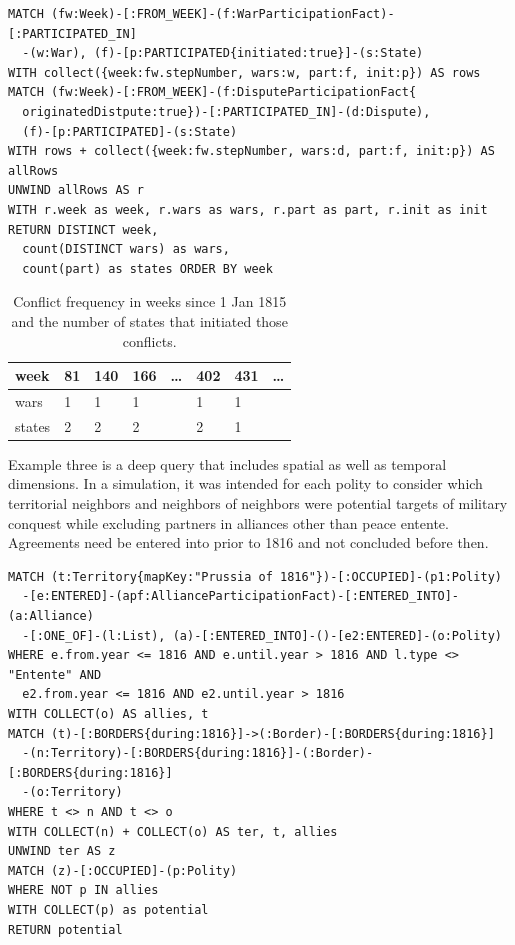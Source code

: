 \documentclass[runningheads]{llncs}
\begin{document}
\begin{lstlisting}[caption={Deep query example}, label={lst:deep}]
MATCH (fw:Week)-[:FROM_WEEK]-(f:WarParticipationFact)-[:PARTICIPATED_IN]
  -(w:War), (f)-[p:PARTICIPATED{initiated:true}]-(s:State)
WITH collect({week:fw.stepNumber, wars:w, part:f, init:p}) AS rows
MATCH (fw:Week)-[:FROM_WEEK]-(f:DisputeParticipationFact{
  originatedDistpute:true})-[:PARTICIPATED_IN]-(d:Dispute), 
  (f)-[p:PARTICIPATED]-(s:State)
WITH rows + collect({week:fw.stepNumber, wars:d, part:f, init:p}) AS allRows
UNWIND allRows AS r
WITH r.week as week, r.wars as wars, r.part as part, r.init as init
RETURN DISTINCT week, 
  count(DISTINCT wars) as wars, 
  count(part) as states ORDER BY week
\end{lstlisting}

\begin{table}[]
\begin{center}
\caption{Conflict frequency in weeks since 1 Jan 1815 and the number of states that initiated those conflicts.}\label{tab1}
\begin{tabular}{l|l|l|l|l|l|l|l}
week    & 81    & 140   & 166   & \dots & 402   & 431   & \dots \\
\hline
wars    & 1     & 1     & 1     &       & 1     & 1     & \\
states  & 2     & 2     & 2     &       & 2     & 1     & \\
\hline
\end{tabular}
\end{center}
\end{table}

Example three is a deep query that includes spatial as well as temporal dimensions.
In a simulation, it was intended for each polity to consider which territorial neighbors and neighbors of neighbors were potential targets of military conquest while excluding partners in alliances other than peace entente. 
Agreements need be entered into prior to 1816 and not concluded before then. 

\begin{lstlisting}[caption={Spatial and temporal dimensions in queries.}, label={lst:multi}]
MATCH (t:Territory{mapKey:"Prussia of 1816"})-[:OCCUPIED]-(p1:Polity)
  -[e:ENTERED]-(apf:AllianceParticipationFact)-[:ENTERED_INTO]-(a:Alliance)
  -[:ONE_OF]-(l:List), (a)-[:ENTERED_INTO]-()-[e2:ENTERED]-(o:Polity)
WHERE e.from.year <= 1816 AND e.until.year > 1816 AND l.type <> "Entente" AND
  e2.from.year <= 1816 AND e2.until.year > 1816
WITH COLLECT(o) AS allies, t
MATCH (t)-[:BORDERS{during:1816}]->(:Border)-[:BORDERS{during:1816}]
  -(n:Territory)-[:BORDERS{during:1816}]-(:Border)-[:BORDERS{during:1816}]
  -(o:Territory)
WHERE t <> n AND t <> o
WITH COLLECT(n) + COLLECT(o) AS ter, t, allies
UNWIND ter AS z
MATCH (z)-[:OCCUPIED]-(p:Polity)
WHERE NOT p IN allies
WITH COLLECT(p) as potential
RETURN potential
\end{lstlisting}
\end{document}
